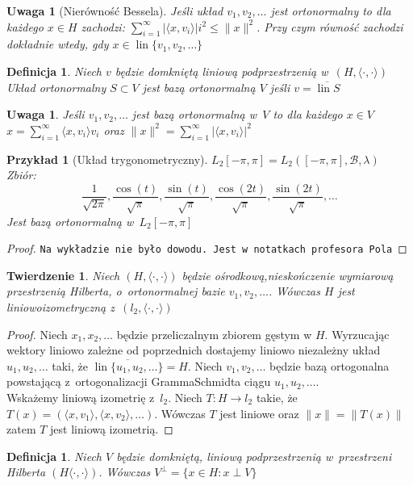 \documentclass[11pt]{mwrep}
\renewcommand{\[}{\begin{equation}}
\renewcommand{\]}{\end{equation}}
\newcommand{\lin}{\operatorname{lin}}
\newcommand{\scal}{\langle \cdot,\cdot \rangle}
\newtheorem{twr}[subsection]{Twierdzenie}%
\newtheorem{uwaga}[subsection]{Uwaga}
\newtheorem{de}[subsection]{Definicja}
\newtheorem{ex}[subsection]{Przykład}
\begin{document}
\begin{uwaga}[Nierówność Bessela]
	Jeśli układ $v_1, v_2 ,\ldots$ jest ortonormalny to dla każdego $x\in H$ zachodzi:
	$\sum_{i=1}^{\infty} |\langle x,v_i \rangle|i^2\le \|x\|^2$. Przy czym równość zachodzi dokładnie wtedy, gdy $x\in \lin\{v_1,v_2,\ldots\}$
\end{uwaga}
\begin{de}
	Niech $v$ będzie domkniętą liniową podprzestrzenią w~$(H,\scal)$ 
	Układ ortonormalny $S \subset V$ jest bazą ortonormalną $V$ jeśli $v=\overline{\lin S}$ 
\end{de}
\begin{uwaga}
	Jeśli $v_1, v_2,\ldots$ jest bazą ortonormalną w~$V$ to dla każdego $x \in V$ 
	$x = \sum_{i=1}^{\infty}\langle x,v_i \rangle v_i $ oraz $\|x\|^2 = \sum_{i=1}^{\infty}|\langle x,v_i \rangle|^2$ 
\end{uwaga}
\begin{ex}[Układ trygonometryczny]
	$L_2[-\pi,\pi] = L_2([-\pi,\pi], \mathcal{B},\lambda)$ 
	Zbiór: 
	$$\frac{1}{\sqrt{2\pi}},\frac{\cos(t)}{\sqrt{\pi}},\frac{\sin(t)}{\sqrt{\pi}}, \frac{\cos(2t)}{\sqrt{\pi}}, \frac{\sin(2t)}{\sqrt{\pi}},\ldots$$
	Jest bazą ortonormalną w~$L_2 [-\pi,\pi]$ 
\end{ex}
\begin{proof}
	\texttt{Na wykładzie nie było dowodu. Jest w~notatkach profesora Pola}
\end{proof}
\begin{twr}
	Niech $(H,\scal)$ będzie ośrodkową,nieskończenie wymiarową przestrzenią Hilberta, o~ortonormalnej bazie $v_1,v_2, \ldots$. Wówczas $H$ jest liniowo\dywiz izometryczną z~$(l_2,\scal)$ 
\end{twr}
\begin{proof}
	Niech $x_1, x_2, \ldots$ będzie przeliczalnym zbiorem gęstym w $H$. 
	Wyrzucając wektory liniowo zależne od poprzednich dostajemy liniowo niezależny układ $u_1,u_2, \ldots$ taki, że $\overline{\lin \{u_1,u_2,\ldots\}} = H$.
	Niech $v_1, v_2, \ldots$ będzie bazą ortogonalna powstającą z~ortogonalizacji Gramma\dywiz Schmidta ciągu $u_1, u_2, \ldots$. \\
	Wskażemy liniową izometrię z~$l_2$.
	Niech $T:H\to l_2$ takie, że $T(x) = (\langle x,v_1 \rangle, \langle x,v_2 \rangle,\ldots)$. Wówczas $T$ jest liniowe oraz $\|x\|=\|T(x)\|$ 
	zatem $T$ jest liniową izometrią.
\end{proof}
\begin{de}
	Niech $V$ będzie domkniętą, liniową  podprzestrzenią w~przestrzeni Hilberta $(H\scal)$.
	Wówczas $V^\perp = \{x \in H : x\perp V\}$ 
\end{de}
\end{document}
